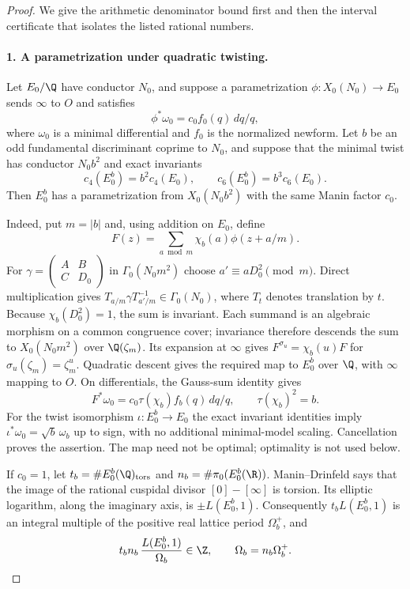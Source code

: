 \begin{proof}
We give the arithmetic denominator bound first and then the interval
certificate that isolates the listed rational numbers.

\paragraph{1. A parametrization under quadratic twisting.}
Let $E_0/\Q$ have conductor $N_0$, and suppose a parametrization
$\phi:X_0(N_0)\to E_0$ sends $\infty$ to $O$ and satisfies
\[
 \phi^*\omega_0=c_0f_0(q)\,dq/q,
\]
where $\omega_0$ is a minimal differential and $f_0$ is the normalized
newform. Let $b$ be an odd fundamental discriminant coprime to $N_0$,
and suppose that the minimal twist has conductor $N_0b^2$ and exact
invariants
\[
 c_4(E_0^b)=b^2c_4(E_0),\qquad
 c_6(E_0^b)=b^3c_6(E_0).
\]
Then $E_0^b$ has a parametrization from $X_0(N_0b^2)$ with the same
Manin factor $c_0$.

Indeed, put $m=|b|$ and, using addition on $E_0$, define
\[
 F(z)=\sum_{a\bmod m}\chi_b(a)\phi(z+a/m).
\]
For $\gamma=\left(\begin{smallmatrix}A&B\\C&D_0\end{smallmatrix}\right)$
in $\Gamma_0(N_0m^2)$ choose $a'\equiv aD_0^2\pmod m$.
Direct multiplication gives
$T_{a/m}\gamma T_{a'/m}^{-1}\in\Gamma_0(N_0)$, where $T_t$
denotes translation by $t$. Because $\chi_b(D_0^2)=1$, the sum is
invariant. Each summand is an algebraic morphism on a common
congruence cover; invariance therefore descends the sum to
$X_0(N_0m^2)$ over $\Q(\zeta_m)$. Its expansion at $\infty$
gives $F^{\sigma_u}=\chi_b(u)F$ for
$\sigma_u(\zeta_m)=\zeta_m^u$. Quadratic descent gives the required
map to $E_0^b$ over $\Q$, with $\infty$ mapping to $O$.
On differentials, the Gauss-sum identity gives
\[
 F^*\omega_0=c_0\tau(\chi_b)f_b(q)\,dq/q,
 \qquad \tau(\chi_b)^2=b.
\]
For the twist isomorphism $\iota:E_0^b\to E_0$ the exact invariant
identities imply
$\iota^*\omega_0=\sqrt b\,\omega_b$ up to sign, with no additional
minimal-model scaling. Cancellation proves the assertion. The map
need not be optimal; optimality is not used below.

If $c_0=1$, let $t_b=\#E_0^b(\Q)_{\rm tors}$ and
$n_b=\#\pi_0(E_0^b(\R))$. Manin--Drinfeld says that the image of
the rational cuspidal divisor $[0]-[\infty]$ is torsion. Its elliptic
logarithm, along the imaginary axis, is $\pm L(E_0^b,1)$.
Consequently $t_bL(E_0^b,1)$ is an integral multiple of the positive
real lattice period $\Omega_b^+$, and
\begin{equation}\label{eq:Cgz-central-integrality}
 t_bn_b\,\frac{L(E_0^b,1)}{\Omega_b}\in\Z,
 \qquad \Omega_b=n_b\Omega_b^+.
\end{equation}


\end{proof}
